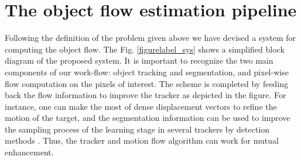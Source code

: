 \section{The object flow estimation pipeline}
\label{sec:desc}

Following the definition of the problem given above we have devised a system for computing the object flow.
The Fig. \ref{figurelabel_sys} shows a simplified block diagram of the proposed system. It is important to recognize the two main 
components of our work-flow: object tracking and segmentation, and pixel-wise flow computation on the pixels of interest.  The scheme is completed by feeding back the flow 
information to improve the tracker as depicted in the figure. For instance, one can make the most of dense displacement vectors to refine the motion of the target, and 
the segmentation information can be used to improve the sampling process of the learning stage in several trackers by detection methods \cite{c22}. Thus, 
the tracker and motion flow algorithm can work for mutual enhancement.



